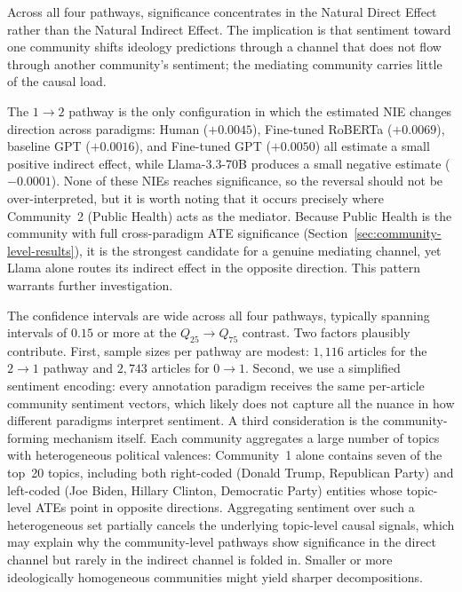 Across all four pathways, significance concentrates in the Natural Direct Effect rather than the Natural Indirect Effect. The implication is that sentiment toward one community shifts ideology predictions through a channel that does not flow through another community's sentiment; the mediating community carries little of the causal load.

The $1 \to 2$ pathway is the only configuration in which the estimated NIE changes direction across paradigms: Human ($+0.0045$), Fine-tuned RoBERTa ($+0.0069$), baseline GPT ($+0.0016$), and Fine-tuned GPT ($+0.0050$) all estimate a small positive indirect effect, while Llama-3.3-70B produces a small negative estimate ($-0.0001$). None of these NIEs reaches significance, so the reversal should not be over-interpreted, but it is worth noting that it occurs precisely where Community~2 (Public Health) acts as the mediator. Because Public Health is the community with full cross-paradigm ATE significance (Section~\ref{sec:community-level-results}), it is the strongest candidate for a genuine mediating channel, yet Llama alone routes its indirect effect in the opposite direction. This pattern warrants further investigation.

The confidence intervals are wide across all four pathways, typically spanning intervals of $0.15$ or more at the $Q_{25} \to Q_{75}$ contrast. Two factors plausibly contribute. First, sample sizes per pathway are modest: $1{,}116$ articles for the $2 \to 1$ pathway and $2{,}743$ articles for $0 \to 1$. Second, we use a simplified sentiment encoding: every annotation paradigm receives the same per-article community sentiment vectors, which likely does not capture all the nuance in how different paradigms interpret sentiment. A third consideration is the community-forming mechanism itself. Each community aggregates a large number of topics with heterogeneous political valences: Community~1 alone contains seven of the top~20 topics, including both right-coded (Donald Trump, Republican Party) and left-coded (Joe Biden, Hillary Clinton, Democratic Party) entities whose topic-level ATEs point in opposite directions. Aggregating sentiment over such a heterogeneous set partially cancels the underlying topic-level causal signals, which may explain why the community-level pathways show significance in the direct channel but rarely in the indirect channel is folded in. Smaller or more ideologically homogeneous communities might yield sharper decompositions.

